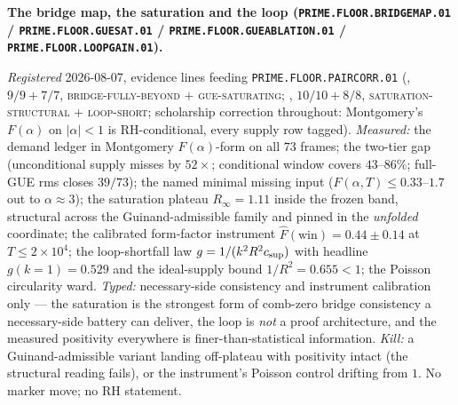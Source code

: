 \par\smallskip\noindent\textbf{The bridge map, the saturation and
the loop (\texttt{PRIME.FLOOR.BRIDGEMAP.01} /
\texttt{PRIME.FLOOR.GUESAT.01} /
\texttt{PRIME.FLOOR.GUEABLATION.01} /
\texttt{PRIME.FLOOR.LOOPGAIN.01}).}
{\sloppy
\emph{Registered} 2026-08-07, evidence lines feeding
\texttt{PRIME.FLOOR.PAIRCORR.01}
(, $9/9 + 7/7$,
\textsc{bridge-fully-beyond} $+$ \textsc{gue-saturating};
, $10/10 + 8/8$,
\textsc{saturation-structural} $+$ \textsc{loop-short};
scholarship correction throughout: Montgomery's $F(\alpha)$ on
$|\alpha| < 1$ is RH-conditional, every supply row tagged).
\emph{Measured:} the demand ledger in Montgomery
$F(\alpha)$-form on all $73$ frames; the two-tier gap
(unconditional supply misses by $52\times$; conditional window
covers $43$--$86\%$; full-GUE rms closes $39/73$); the named
minimal missing input ($F(\alpha, T) \le 0.33$--$1.7$ out to
$\alpha \approx 3$); the saturation plateau $R_\infty = 1.11$
inside the frozen band, structural across the Guinand-admissible
family and pinned in the \emph{unfolded} coordinate; the
calibrated form-factor instrument
$\hat F(\mathrm{win}) = 0.44 \pm 0.14$ at $T \le 2\times10^4$;
the loop-shortfall law $g = 1/(k^2 R^2 c_{\rm sup})$ with
headline $g(k{=}1) = 0.529$ and the ideal-supply bound
$1/R^2 = 0.655 < 1$; the Poisson circularity ward.
\emph{Typed:} necessary-side consistency and instrument
calibration only --- the saturation is the strongest form of
comb-zero bridge consistency a necessary-side battery can
deliver, the loop is \emph{not} a proof architecture, and the
measured positivity everywhere is finer-than-statistical
information.  \emph{Kill:} a Guinand-admissible variant landing
off-plateau with positivity intact (the structural reading
fails), or the instrument's Poisson control drifting from $1$.
No marker move; no RH statement.\par}


